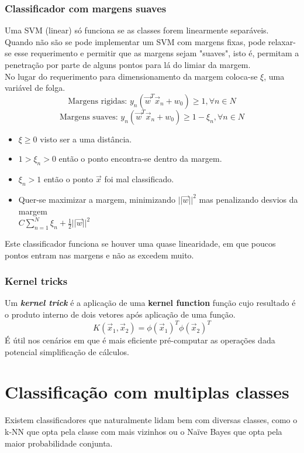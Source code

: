 \documentclass[]{report}
\begin{document}
\subsection{Classificador com margens suaves}
Uma SVM (linear) só funciona se as classes forem linearmente separáveis. Quando não são se pode implementar um SVM com margens fixas, pode relaxar-se esse requerimento e permitir que as margens sejam "suaves", isto é, permitam a penetração por parte de alguns pontos para lá do limiar da margem.\\
No lugar do requerimento para dimensionamento da margem coloca-se $\xi$, uma variável de folga.
$$\text{Margens rigidas: } y_n(\vec{w}^T \vec{x}_n + w_0) \geq 1, \forall n \in N$$
$$\text{Margens suaves: } y_n(\vec{w}^T \vec{x}_n + w_0) \geq 1 - \xi_n, \forall n \in N$$
\begin{itemize}
\item $\xi \geq 0$ visto ser a uma distância.
\item $1 > \xi_n > 0$ então o ponto encontra-se dentro da margem.
\item $\xi_n > 1$ então o ponto $\vec{x}$ foi mal classificado.
\item Quer-se maximizar a margem, minimizando $||\vec{w}||^2$ mas penalizando desvios da margem\\
$\displaystyle C \sum_{n=1}^N \xi_n + \frac{1}{2}||\vec{w}||^2$
\end{itemize}
Este classificador funciona se houver uma quase linearidade, em que poucos pontos entram nas margens e não as excedem muito.
\subsection{Kernel tricks}
Um \textit{\textbf{kernel trick}} é a aplicação de uma \textbf{kernel function} função cujo resultado é o produto interno de dois vetores após aplicação de uma função.
$$K(\vec{x}_1,\vec{x}_2) = \phi(\vec{x}_1)^T \phi(\vec{x}_2)^T$$
É útil nos cenários em que é mais eficiente pré-computar as operações dada potencial simplificação de cálculos.
\chapter{Classificação com multiplas classes}
Existem classificadores que naturalmente lidam bem com diversas classes, como o k-NN que opta pela classe com mais vizinhos ou o Naïve Bayes que opta pela maior probabilidade conjunta.
\end{document}
